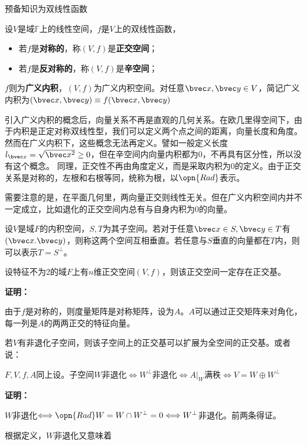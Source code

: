 

\begin{issues}
\issueDraft 预备知识为双线性函数
\end{issues}

\begin{definition}{}
设$V$是域$\mathbb F$上的线性空间，$f$是$V$上的双线性函数，
\begin{itemize}
\item 若$f$是\textbf{对称的}，称$(V,f)$是\textbf{正交空间}；
\item 若$f$是\textbf{反对称的}，称$(V,f)$是\textbf{辛空间}；
\end{itemize}
$f$则为\textbf{广义内积}，$(V,f)$为广义内积空间。对任意$\bvec x,\bvec y\in V$，简记广义内积为$(\bvec x,\bvec y)\equiv f(\bvec x,\bvec y)$
\end{definition}
引入广义内积的概念后，向量关系不再是直观的几何关系。在欧几里得空间下，由于内积是正定对称双线性型，我们可以定义两个点之间的距离，向量长度和角度。然而在广义内积下，这些概念无法再定义。譬如一般定义长度$l_{\bvec x}=\sqrt{\bvec x^2}\ge 0$，但在辛空间内向量内积都为0，不再具有区分性，所以没有这个概念。
同理，正交性不再由角度定义，而是采取内积为$0$的定义。由于正交关系是对称的，左根和右根等同，统称为根，以$\opn{Rad}$表示。

需要注意的是，在平面几何里，两向量正交则线性无关。但在广义内积空间内并不一定成立，比如退化的正交空间内总有与自身内积为0的向量。
\begin{definition}{}

\end{definition}
\begin{definition}{}
设$V$是域$F$的内积空间，$S,T$为其子空间。若对于任意$\bvec x\in S,\bvec  y\in T$有$(\bvec x.\bvec y)$，则称这两个空间互相垂直。若任意与$S$垂直的向量都在$T$内，则可以表示$T=S^{\bot}$。
\end{definition}
\begin{theorem}{}
设特征不为2的域$F$上有$n$维正交空间$(V,f)$，则该正交空间一定存在正交基。
\end{theorem}
\textbf{证明：}

由于$f$是对称的，则度量矩阵是对称矩阵，设为$A$。$A$可以通过正交矩阵来对角化，每一列是$A$的两两正交的特征向量。

若$V$有非退化子空间，则该子空间上的正交基可以扩展为全空间的正交基。或者说：

\begin{theorem}{}
$F,V,f,A$同上设。子空间$W$非退化$\Longleftrightarrow  W^{\bot}$非退化$\Longleftrightarrow A|_{W}$满秩$\Longleftrightarrow V=W\oplus W^{\bot}$
\end{theorem}
\textbf{证明：}

$W$非退化$\Longleftrightarrow \opn{Rad}W=W\cap W^{\bot}=0\Longleftrightarrow  W^{\bot}$非退化。前两条得证。

根据定义，$W$非退化又意味着

